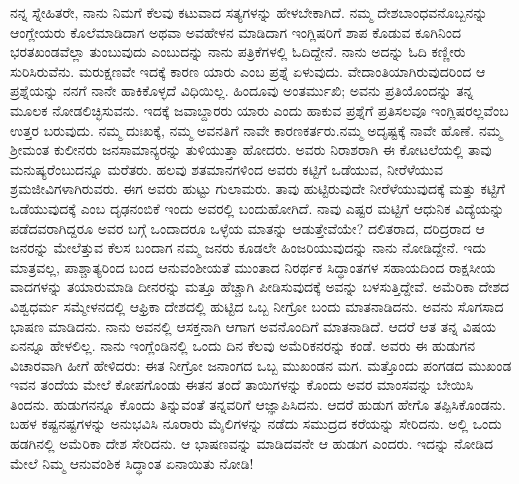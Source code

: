 ನನ್ನ ಸ್ನೇಹಿತರೇ, ನಾನು ನಿಮಗೆ ಕೆಲವು ಕಟುವಾದ ಸತ್ಯಗಳನ್ನು ಹೇಳಬೇಕಾಗಿದೆ. ನಮ್ಮ ದೇಶಬಾಂಧವನೊಬ್ಬನನ್ನು ಆಂಗ್ಲೇಯರು ಕೊಲೆಮಾಡಿದಾಗ ಅಥವಾ ಅವಹೇಳನ ಮಾಡಿದಾಗ ಇಂಗ್ಲಿಷರಿಗೆ ಶಾಪ ಕೊಡುವ ಕೂಗಿನಿಂದ ಭರತಖಂಡವೆಲ್ಲಾ ತುಂಬುವುದು ಎಂಬುದನ್ನು ನಾನು ಪತ್ರಿಕೆಗಳಲ್ಲಿ ಓದಿದ್ದೇನೆ. ನಾನು ಅದನ್ನು ಓದಿ ಕಣ್ಣೀರು ಸುರಿಸಿರುವೆನು. ಮರುಕ್ಷಣವೇ ಇದಕ್ಕೆ ಕಾರಣ ಯಾರು ಎಂಬ ಪ್ರಶ್ನೆ ಏಳುವುದು. ವೇದಾಂತಿಯಾಗಿರುವುದರಿಂದ ಆ ಪ್ರಶ್ನೆಯನ್ನು ನನಗೆ ನಾನೇ ಹಾಕಿಕೊಳ್ಳದೆ ವಿಧಿಯಿಲ್ಲ. ಹಿಂದೂವು ಅಂತರ್ಮುಖಿ; ಅವನು ಪ್ರತಿಯೊಂದನ್ನು ತನ್ನ ಮೂಲಕ ನೋಡಲಿಚ್ಛಿಸುವನು. ಇದಕ್ಕೆ ಜವಾಬ್ದಾರರು ಯಾರು ಎಂದು ಹಾಕುವ ಪ್ರಶ್ನೆಗೆ ಪ್ರತಿಸಲವೂ ಇಂಗ್ಲಿಷರಲ್ಲವೆಂಬ ಉತ್ತರ ಬರುವುದು. ನಮ್ಮ ದುಃಖಕ್ಕೆ, ನಮ್ಮ ಅವನತಿಗೆ ನಾವೇ ಕಾರಣಕರ್ತರು.\break ನಮ್ಮ ಅದೃಷ್ಟಕ್ಕೆ ನಾವೇ ಹೊಣೆ. ನಮ್ಮ ಶ‍್ರೀಮಂತ ಕುಲೀನರು ಜನಸಾಮಾನ್ಯ\-ರನ್ನು ತುಳಿಯುತ್ತಾ ಹೋದರು. ಅವರು ನಿರಾಶರಾಗಿ ಈ ಕೋಟಲೆಯಲ್ಲಿ ತಾವು ಮನುಷ್ಯರೆಂಬುದನ್ನೂ ಮರೆತರು. ಹಲವು ಶತಮಾನಗಳಿಂದ ಅವರು ಕಟ್ಟಿಗೆ ಒಡೆಯುವ, ನೀರೆಳೆಯುವ ಶ್ರಮಜೀವಿಗಳಾಗಿರುವರು. ಈಗ ಅವರು ಹುಟ್ಟು ಗುಲಾಮರು. ತಾವು ಹುಟ್ಟಿರುವುದೇ ನೀರೆಳೆಯುವುದಕ್ಕೆ ಮತ್ತು ಕಟ್ಟಿಗೆ ಒಡೆಯುವುದಕ್ಕೆ ಎಂಬ ದೃಢನಂಬಿಕೆ ಇಂದು ಅವರಲ್ಲಿ ಬಂದುಹೋಗಿದೆ. ನಾವು ಎಷ್ಟರ ಮಟ್ಟಿಗೆ ಆಧುನಿಕ ವಿದ್ಯೆಯನ್ನು ಪಡೆದವರಾಗಿದ್ದರೂ ಅವರ ಬಗ್ಗೆ ಒಂದಾದರೂ ಒಳ್ಳೆಯ ಮಾತನ್ನು ಆಡುತ್ತೇವೆಯೇ? ದಲಿತರಾದ, ದರಿದ್ರರಾದ ಆ ಜನರನ್ನು ಮೇಲೆತ್ತುವ ಕೆಲಸ ಬಂದಾಗ ನಮ್ಮ ಜನರು ಕೂಡಲೇ ಹಿಂಜರಿಯುವುದನ್ನು ನಾನು ನೋಡಿದ್ದೇನೆ. ಇದು ಮಾತ್ರವಲ್ಲ, ಪಾಶ್ಚಾತ್ಯರಿಂದ ಬಂದ ಆನುವಂಶೀಯತೆ ಮುಂತಾದ ನಿರರ್ಥಕ ಸಿದ್ಧಾಂತಗಳ ಸಹಾಯದಿಂದ ರಾಕ್ಷಸೀಯ ವಾದಗಳನ್ನು ತಯಾರುಮಾಡಿ ದೀನರನ್ನು ಮತ್ತೂ ಹೆಚ್ಚಾಗಿ ಪೀಡಿಸುವುದಕ್ಕೆ ಅವನ್ನು ಬಳಸುತ್ತಿದ್ದೇವೆ. ಅಮೆರಿಕಾ ದೇಶದ ವಿಶ್ವಧರ್ಮ ಸಮ್ಮೇಳನದಲ್ಲಿ ಆಫ್ರಿಕಾ ದೇಶದಲ್ಲಿ ಹುಟ್ಟಿದ ಒಬ್ಬ ನೀಗ್ರೋ ಬಂದು ಮಾತನಾಡಿದನು. ಅವನು ಸೊಗಸಾದ ಭಾಷಣ ಮಾಡಿದನು. ನಾನು ಅವನಲ್ಲಿ ಆಸಕ್ತನಾಗಿ ಆಗಾಗ ಅವನೊಂದಿಗೆ ಮಾತನಾಡಿದೆ. ಆದರೆ ಆತ ತನ್ನ ವಿಷಯ ಏನನ್ನೂ ಹೇಳಲಿಲ್ಲ. ನಾನು ಇಂಗ್ಲೆಂಡಿನಲ್ಲಿ ಒಂದು ದಿನ ಕೆಲವು ಅಮೆರಿಕನರನ್ನು ಕಂಡೆ. ಅವರು ಈ ಹುಡುಗನ ವಿಚಾರವಾಗಿ ಹೀಗೆ ಹೇಳಿದರು: ಈತ ನೀಗ್ರೋ ಜನಾಂಗದ ಒಬ್ಬ ಮುಖಂಡನ ಮಗ. ಮತ್ತೊಂದು ಪಂಗಡದ ಮುಖಂಡ ಇವನ ತಂದೆಯ ಮೇಲೆ ಕೋಪಗೊಂಡು ಈತನ ತಂದೆ ತಾಯಿಗಳನ್ನು ಕೊಂದು ಅವರ ಮಾಂಸವನ್ನು ಬೇಯಿಸಿ ತಿಂದನು. ಹುಡುಗನನ್ನೂ ಕೊಂದು ತಿನ್ನುವಂತೆ ತನ್ನವರಿಗೆ ಆಜ್ಞಾಪಿಸಿದನು. ಆದರೆ ಹುಡುಗ ಹೇಗೊ ತಪ್ಪಿಸಿಕೊಂಡನು. ಬಹಳ ಕಷ್ಟನಷ್ಟಗಳನ್ನು ಅನುಭವಿಸಿ ನೂರಾರು ಮೈಲಿಗಳನ್ನು ನಡೆದು ಸಮುದ್ರದ ಕರೆಯನ್ನು ಸೇರಿದನು. ಅಲ್ಲಿ ಒಂದು ಹಡಗಿನಲ್ಲಿ ಅಮೆರಿಕಾ ದೇಶ ಸೇರಿದನು. ಆ ಭಾಷಣವನ್ನು ಮಾಡಿದವನೇ ಆ ಹುಡುಗ ಎಂದರು. ಇದನ್ನು ನೋಡಿದ ಮೇಲೆ ನಿಮ್ಮ ಆನುವಂಶಿಕ ಸಿದ್ಧಾಂತ ಏನಾಯಿತು ನೋಡಿ!


